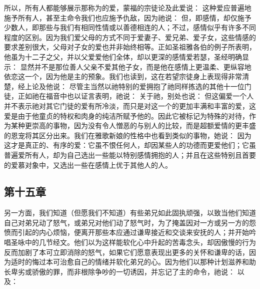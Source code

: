 所以，所有人都能够展示那称为的爱，蒙福的宗徒论及此爱说： 这种爱应普遍地施予所有人，甚至主命令我们也应施予仇敌，因为祂说： 但，即感情，却仅施予少数人，即那些与我们有相同性情或以善德相连的人；不过，感情似乎有许多不同程度的区别。因为我们爱父母的方式不同于爱妻子、爱兄弟、爱子女，这些情感的要求差别很大，父母对子女的爱也并非始终相等。正如圣祖雅各伯的例子所表明，他虽为十二子之父，并以父爱爱他们全体，却以更深的感情爱若瑟，圣经明确显示： 显然并不是那位善人父亲不爱其他子女，而是他在感情上更温柔、更纵容地依恋这一个，因为他是主的预象。我们也读到，这在若望宗徒身上表现得非常清楚，经上论及他说： 尽管主当然以祂特别的爱拥抱了祂同样拣选的其他十一位门徒，正如祂在福音中也以证言表明，祂说： 关于祂，别处也说： 但这偏爱一个人并不表示祂对其它门徒的爱有所冷淡，而只是对这一个的更加丰满和丰富的爱，这爱是由于他童贞的特权和肉身的纯洁所赋予他的。因此它被标记为特殊的对待，作为某种更崇高的事物，因为没有令人憎恶的与别人的比较，而是超额爱情的更丰盛的恩宠将其区分出来。我们在雅歌新娘的性格中也看到类似的事物，她说： 因为这才是真正的、有序的爱：它虽不恨任何人，却因某些人的功德而更爱他们；它虽普遍爱所有人，却为自己选出一些能以特别感情拥抱的人；并且在这些特别且首要的爱慕对象中，又选出一些在感情上优于其他人的人。\par


\subsection{第十五章}

\par

另一方面，我们知道（但愿我们不知道）有些弟兄如此固执顽强，以致当他们知道自己对弟兄动了怒气，或弟兄对他们动了怒气时，为了掩盖因对一方或另一方的怨愤而引起的内心烦恼，便离开那些本应通过谦卑接近和交谈来安抚的人；并开始吟唱圣咏中的几节经文。他们以为这样能软化心中升起的苦毒念头，却因傲慢的行为反而加剧了本可立即消除的怒气，如果它们愿意表现出更多的关怀和谦卑的话，因为适时的悔过本可治愈自己的情绪并软化弟兄的心。因为他们以那种计划滋养和助长卑劣或骄傲的罪，而非根除争吵的一切诱因，并忘记了主的命令，祂说： 以及：\par

